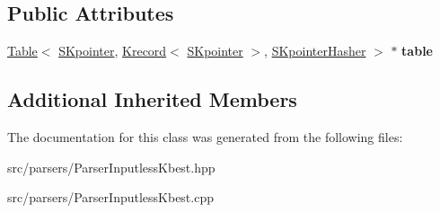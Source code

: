 \subsection*{Public Attributes}
\begin{DoxyCompactItemize}
\item 
\mbox{\label{classParserInputlessKbest_a2d365e6e67fa6e828b7dbc410e9afd80}} 
\mbox{\hyperlink{classTable}{Table}}$<$ \mbox{\hyperlink{classSKpointer}{S\+Kpointer}}, \mbox{\hyperlink{classKrecord}{Krecord}}$<$ \mbox{\hyperlink{classSKpointer}{S\+Kpointer}} $>$, \mbox{\hyperlink{structSKpointerHasher}{S\+Kpointer\+Hasher}} $>$ $\ast$ {\bfseries table}
\end{DoxyCompactItemize}
\subsection*{Additional Inherited Members}


The documentation for this class was generated from the following files\+:\begin{DoxyCompactItemize}
\item 
src/parsers/Parser\+Inputless\+Kbest.\+hpp\item 
src/parsers/Parser\+Inputless\+Kbest.\+cpp\end{DoxyCompactItemize}
